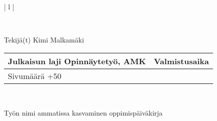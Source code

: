 
\begin{tabular}{ | l | }

    \\

    \hline
    \begin{minipage}[b]{6cm}
        Tekijä(t)
        \newline
        Kimi Malkamäki 
    \end{minipage}%
    \begin{minipage}{8.5cm}
        \begin{tabular}{ | l | c | }
            \begin{minipage}[t][1cm][t]{4.25cm}
                Julkaisun laji
                \newline
                Opinnäytetyö, AMK
            \end{minipage} & %
            \begin{minipage}{3.62cm}
                Valmistusaika
                \newline
                2024
            \end{minipage} \\ \hline%
            \begin{minipage}[t][1cm][t]{4.25cm}
                Sivumäärä
                \newline 
                31+50
            \end{minipage}
            &  \\ \hline
        \end{tabular}
    \end{minipage}%
      \\ \hline

    \begin{minipage}[t][2cm][t]{8cm}
    Työn nimi 
        \newline 
    ammatissa kasvaminen 
        \newline 
    oppimispäiväkirja  
    \end{minipage}\\ \hline


\end{tabular}
